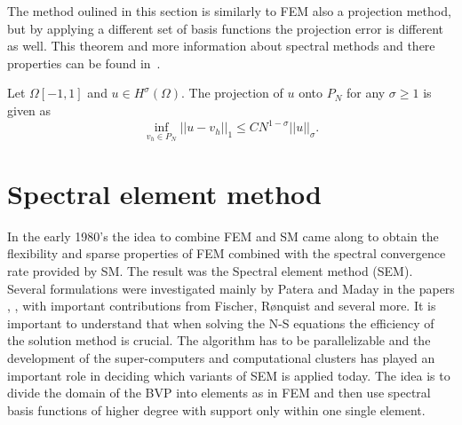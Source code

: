 The method oulined in this section is similarly to FEM also a projection method, 
but by applying a different set of basis functions the projection error is different 
as well. This theorem and more information about spectral methods and there properties can be 
found in~\cite{Canuto2007}.

\begin{theorem}
    Let $\Omega [-1,1]$ and  $u \in H^{\sigma}(\Omega)$. The projection 
    of $u$ onto $P_N$ for any $\sigma \ge 1$ is given as  
    \begin{equation}
        \inf_{v_h\in P_N}||u-v_h||_1 \le CN^{1-\sigma}||u||_{\sigma}.
    \end{equation}
    \label{thm:smconvergence}
\end{theorem}


\section{Spectral element method} \label{sem}
In the early 1980's the idea to combine FEM and SM came along to obtain the 
flexibility and sparse properties of FEM 
combined with the spectral convergence rate provided by SM. 
The result was the Spectral element method (SEM). Several formulations were investigated mainly by 
Patera and Maday in the papers \cite{maday1989}, \cite{Patera1984}, \cite{Patera1986} with 
important contributions from Fischer, Rønquist and several more.
It is important to understand that when solving the N-S equations the efficiency of the solution 
method is crucial. The algorithm has to be parallelizable and the development of the
super-computers and computational clusters has played an important role in 
deciding which variants of SEM is applied today. 
The idea is to divide the domain of the BVP into elements as in FEM and then use spectral basis 
functions of higher degree with support only within one single element. 

